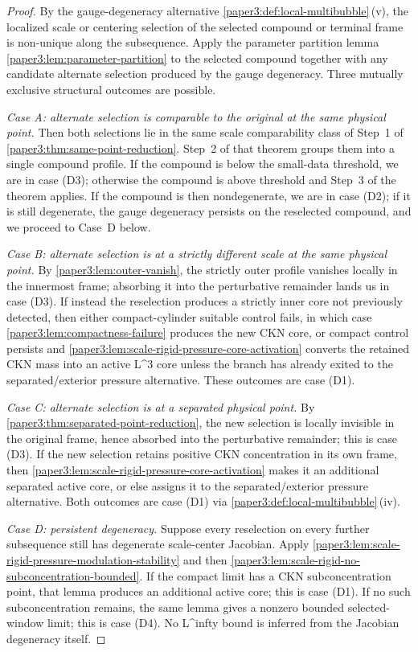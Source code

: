 \documentclass[11pt]{amsart}
\def\({}%
\def\){}%
\def\infty{infty}%
\theoremstyle{plain}
\theoremstyle{definition}
\theoremstyle{remark}
\begin{document}
\begin{proof}
By the gauge-degeneracy alternative
\cref{paper3:def:local-multibubble}\,(v), the localized scale or centering
selection of the selected compound or terminal frame is non-unique along the
subsequence.  Apply the parameter partition lemma
\cref{paper3:lem:parameter-partition} to the selected compound together with
any candidate alternate selection produced by the gauge degeneracy.  Three
mutually exclusive structural outcomes are possible.

\noindent\textit{Case A: alternate selection is comparable to the original at
the same physical point.}  Then both selections lie in the same scale
comparability class of Step~1 of \cref{paper3:thm:same-point-reduction}.
Step~2 of that theorem groups them into a single compound profile.  If the
compound is below the small-data threshold, we are in case (D3); otherwise
the compound is above threshold and Step~3 of the theorem applies.  If the
compound is then nondegenerate, we are in case (D2); if it is still
degenerate, the gauge degeneracy persists on the reselected compound, and we
proceed to Case~D below.

\noindent\textit{Case B: alternate selection is at a strictly different
scale at the same physical point.}  By
\cref{paper3:lem:outer-vanish}, the strictly outer profile vanishes locally
in the innermost frame; absorbing it into the perturbative remainder lands
us in case (D3).  If instead the reselection produces a strictly inner core
not previously detected, then either compact-cylinder suitable control fails,
in which case \cref{paper3:lem:compactness-failure} produces the new CKN core,
or compact control persists and
\cref{paper3:lem:scale-rigid-pressure-core-activation} converts the retained
CKN mass into an active \(L^3\) core unless the branch has already exited to
the separated/exterior pressure alternative.  These outcomes are case (D1).

\noindent\textit{Case C: alternate selection is at a separated physical
point.}  By \cref{paper3:thm:separated-point-reduction}, the new selection
is locally invisible in the original frame, hence absorbed into the
perturbative remainder; this is case (D3).  If the new selection retains
positive CKN concentration in its own frame, then
\cref{paper3:lem:scale-rigid-pressure-core-activation} makes it an additional
separated active core, or else assigns it to the separated/exterior pressure
alternative.  Both outcomes are case (D1) via
\cref{paper3:def:local-multibubble}\,(iv).

\noindent\textit{Case D: persistent degeneracy.}  Suppose every reselection
on every further subsequence still has degenerate scale-center Jacobian.
Apply \cref{paper3:lem:scale-rigid-pressure-modulation-stability} and then
\cref{paper3:lem:scale-rigid-no-subconcentration-bounded}.  If the compact
limit has a CKN subconcentration point, that lemma produces an additional
active core; this is case (D1).  If no such subconcentration remains, the same
lemma gives a nonzero bounded selected-window limit; this is case (D4).  No
\(L^\infty\) bound is inferred from the Jacobian degeneracy itself.
\end{proof}
\end{document}
